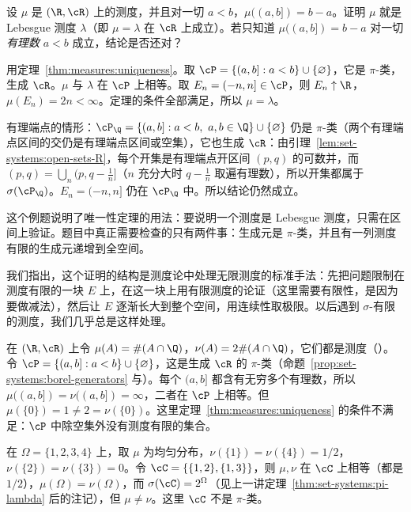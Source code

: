 \begin{workedexample}\label{we:measures:uniqueness-lebesgue}
设 $\mu$ 是 $(\R,\cR)$ 上的测度，并且对一切 $a<b$，$\mu((a,b])=b-a$。证明 $\mu$ 就是 Lebesgue 测度 $\lambda$（即 $\mu=\lambda$ 在 $\cR$ 上成立）。若只知道 $\mu((a,b])=b-a$ 对一切\emph{有理数} $a<b$ 成立，结论是否还对？
\end{workedexample}
\begin{solution}
用定理~\ref{thm:measures:uniqueness}。取 $\cP=\{(a,b]:a<b\}\cup\{\varnothing\}$，它是 $\pi$-类，生成 $\cR$。$\mu$ 与 $\lambda$ 在 $\cP$ 上相等。取 $E_n=(-n,n]\in\cP$，则 $E_n\uparrow\R$，$\mu(E_n)=2n<\infty$。定理的条件全部满足，所以 $\mu=\lambda$。

有理端点的情形：$\cP_\Q=\{(a,b]:a<b,\ a,b\in\Q\}\cup\{\varnothing\}$ 仍是 $\pi$-类（两个有理端点区间的交仍是有理端点区间或空集），它也生成 $\cR$：由引理~\ref{lem:set-systems:open-sets-R}，每个开集是有理端点开区间 $(p,q)$ 的可数并，而 $(p,q)=\bigcup_n(p,q-\frac1n]$（$n$ 充分大时 $q-\frac1n$ 取遍有理数），所以开集都属于 $\sigma(\cP_\Q)$。$E_n=(-n,n]$ 仍在 $\cP_\Q$ 中。所以结论仍然成立。

这个例题说明了唯一性定理的用法：要说明一个测度是 Lebesgue 测度，只需在区间上验证。题目中真正需要检查的只有两件事：生成元是 $\pi$-类，并且有一列测度有限的生成元递增到全空间。
\end{solution}

我们指出，这个证明的结构是测度论中处理无限测度的标准手法：先把问题限制在测度有限的一块 $E$ 上，在这一块上用有限测度的论证（这里需要有限性，是因为要做减法），然后让 $E$ 逐渐长大到整个空间，用连续性取极限。以后遇到 $\sigma$-有限的测度，我们几乎总是这样处理。

\begin{example}[有限性条件不能去掉]
在 $(\R,\cR)$ 上令 $\mu(A)=\#(A\cap\Q)$，$\nu(A)=2\#(A\cap\Q)$，它们都是测度（）。令 $\cP=\{(a,b]:a<b\}\cup\{\varnothing\}$，这是生成 $\cR$ 的 $\pi$-类（命题~\ref{prop:set-systems:borel-generators} 与）。每个 $(a,b]$ 都含有无穷多个有理数，所以 $\mu((a,b])=\nu((a,b])=\infty$，二者在 $\cP$ 上相等。但 $\mu(\{0\})=1\neq2=\nu(\{0\})$。这里定理~\ref{thm:measures:uniqueness} 的条件不满足：$\cP$ 中除空集外没有测度有限的集合。
\end{example}

\begin{example}[$\pi$-类条件不能去掉]
在 $\Omega=\{1,2,3,4\}$ 上，取 $\mu$ 为均匀分布，$\nu(\{1\})=\nu(\{4\})=1/2$，$\nu(\{2\})=\nu(\{3\})=0$。令 $\cC=\{\{1,2\},\{1,3\}\}$，则 $\mu,\nu$ 在 $\cC$ 上相等（都是 $1/2$），$\mu(\Omega)=\nu(\Omega)$，而 $\sigma(\cC)=2^\Omega$（见上一讲定理~\ref{thm:set-systems:pi-lambda} 后的注记），但 $\mu\neq\nu$。这里 $\cC$ 不是 $\pi$-类。
\end{example}

